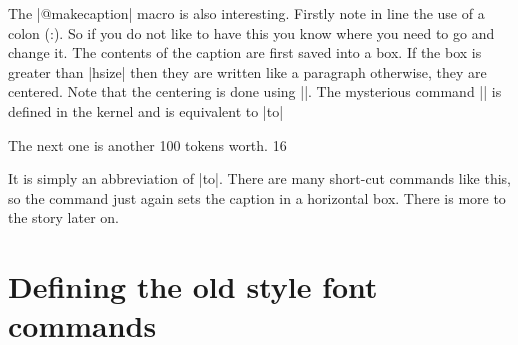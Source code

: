 \begin{teX}
\newlength\abovecaptionskip
\newlength\belowcaptionskip
\setlength{}
\setlength{}

\long{}
\end{teX}

\begin{multicols}{2}
The |@makecaption| macro is also interesting. Firstly note in line  the use of a colon (:). So if you do not like to have this you know where you need to go and change it. The contents of the caption are first saved into a box. If the box is greater than |hsize| then they are written like a paragraph otherwise, they are centered. Note that the centering is done using |\hfil\box\@tempoxa\hfil|. The mysterious command |\hb@xt| is defined in the kernel and
is equivalent to |\hbox to|
\end{multicols}

\begin{teXXX}
  \hb@xt@ The next one is another 100 tokens worth.
  16 \def\hb@xt@{\hbox to}
\end{teXXX}

\begin{multicols}{2}
It is simply an abbreviation of |\hbox to|. There are many short-cut commands like this, so the command just again sets the caption in a  horizontal box. There is more to the story later on. 
\end{multicols}


\section*{Defining the old style font commands}

\begin{teX}
\DeclareOldFontCommand{\rm}{\normalfont\rmfamily}{\mathrm}
\DeclareOldFontCommand{\sf}{\normalfont\sffamily}{\mathsf}
\DeclareOldFontCommand{\tt}{\normalfont\ttfamily}{\mathtt}
\DeclareOldFontCommand{\bf}{\normalfont\bfseries}{\mathbf}
\DeclareOldFontCommand{\it}{\normalfont\itshape}{\mathit}
\DeclareOldFontCommand{\sl}{\normalfont\slshape}{\@nomath\sl}
\DeclareOldFontCommand{\sc}{\normalfont\scshape}{\@nomath\sc}
\DeclareRobustCommand*\cal{\@fontswitch\relax\mathcal}
\DeclareRobustCommand*\mit{\@fontswitch\relax\mathnormal}
\end{teX}


